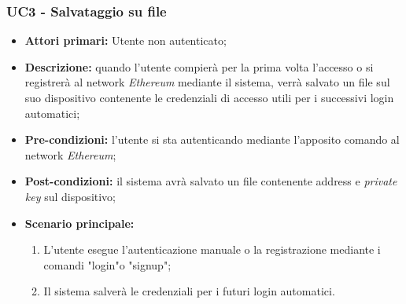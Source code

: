 \subsubsection{UC3 - Salvataggio su file}
\begin{itemize}
	\item \textbf{Attori primari:} Utente non autenticato;
	\item \textbf{Descrizione:} quando l'utente compierà per la prima volta l'accesso o si registrerà al network \textit{Ethereum\glo} mediante il sistema, verrà salvato un file sul suo dispositivo contenente le credenziali di accesso utili per i successivi login automatici; 
	\item \textbf{Pre-condizioni:} l'utente si sta autenticando mediante l'apposito comando al network \textit{Ethereum\glos};
	\item \textbf{Post-condizioni:} il sistema avrà salvato un file contenente address e \textit{private key\glo} sul dispositivo;
	\item \textbf{Scenario principale:} 
	\begin{enumerate}
		\item L'utente esegue l'autenticazione manuale o la registrazione mediante i comandi "login"o "signup";
		\item Il sistema salverà le credenziali per i futuri login automatici.
	\end{enumerate}
\end{itemize}